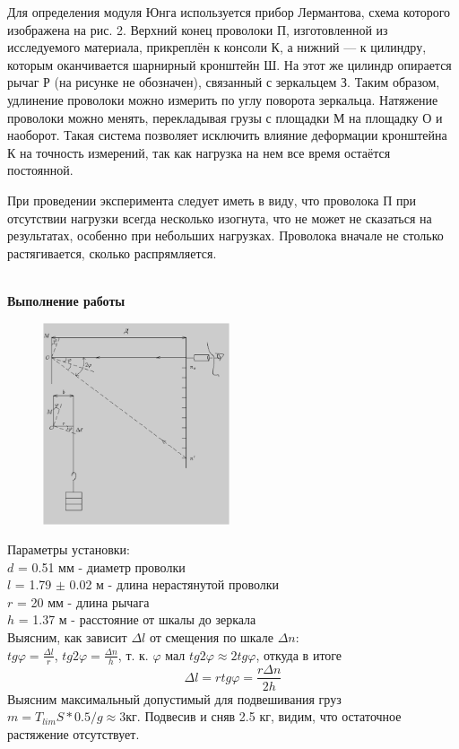 \documentclass[12pt]{article}
\begin{document}
	Для определения модуля Юнга используется прибор Лермантова, схема которого изображена на рис. 2. Верхний конец проволоки П, изготовленной из
	исследуемого материала, прикреплён к
	консоли К, а нижний — к цилиндру, которым оканчивается шарнирный кронштейн Ш. На этот же цилиндр опирается рычаг Р (на рисунке не обозначен),
	связанный с зеркальцем З. Таким образом, удлинение проволоки можно измерить по углу поворота зеркальца. Натяжение проволоки можно менять, перекладывая грузы с площадки М на площадку О и наоборот. Такая система позволяет исключить влияние деформации
	кронштейна К на точность измерений,
	так как нагрузка на нем все время остаётся постоянной. 
	
	При проведении эксперимента следует иметь в виду, что проволока П при отсутствии нагрузки всегда несколько изогнута, что не может не
	сказаться на результатах, особенно при
	небольших нагрузках. Проволока вначале не столько растягивается, сколько
	распрямляется.
	\\ \\
	\begin{center}
		\textbf{Выполнение работы}
	\end{center}
	
	\begin{figure}
		\includegraphics[width=5.5cm]{6_3}
	\end{figure}
	
	Параметры установки:\\
	$d$ = 0.51 мм - диаметр проволки\\
	$l$ = 1.79 $\pm$ 0.02 м - длина нерастянутой проволки\\
	$r$ = 20 мм - длина рычага\\
	$h$ = 1.37 м - расстояние от шкалы до зеркала\\
	Выясним, как зависит $\Delta l$ от смещения по шкале $\Delta n$:\\
	$tg\varphi = \frac{\Delta l}{r}$, $tg2\varphi = \frac{\Delta n}{h}$, т. к. $\varphi$ мал $tg2\varphi \approx 2tg\varphi$, откуда в итоге $$\Delta l = rtg\varphi = \frac{r \Delta n}{2h}$$
	Выясним максимальный допустимый для подвешивания груз $m = T_{lim}S*0.5/g \approx 3 кг$. Подвесив и сняв 2.5 кг, видим, что остаточное растяжение отсутствует.\\
	
\end{document}
